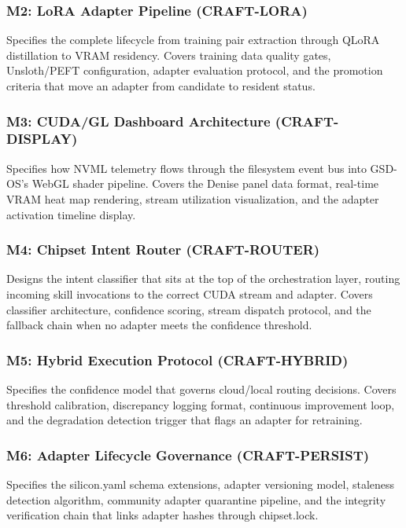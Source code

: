 \documentclass[11pt,letterpaper]{article}
\begin{document}
\subsubsection{M2: LoRA Adapter Pipeline (CRAFT-LORA)}

Specifies the complete lifecycle from training pair extraction through QLoRA distillation to VRAM residency. Covers training data quality gates, Unsloth/PEFT configuration, adapter evaluation protocol, and the promotion criteria that move an adapter from candidate to resident status.

\subsubsection{M3: CUDA/GL Dashboard Architecture (CRAFT-DISPLAY)}

Specifies how NVML telemetry flows through the filesystem event bus into GSD-OS's WebGL shader pipeline. Covers the Denise panel data format, real-time VRAM heat map rendering, stream utilization visualization, and the adapter activation timeline display.

\subsubsection{M4: Chipset Intent Router (CRAFT-ROUTER)}

Designs the intent classifier that sits at the top of the orchestration layer, routing incoming skill invocations to the correct CUDA stream and adapter. Covers classifier architecture, confidence scoring, stream dispatch protocol, and the fallback chain when no adapter meets the confidence threshold.

\subsubsection{M5: Hybrid Execution Protocol (CRAFT-HYBRID)}

Specifies the confidence model that governs cloud/local routing decisions. Covers threshold calibration, discrepancy logging format, continuous improvement loop, and the degradation detection trigger that flags an adapter for retraining.

\subsubsection{M6: Adapter Lifecycle Governance (CRAFT-PERSIST)}

Specifies the silicon.yaml schema extensions, adapter versioning model, staleness detection algorithm, community adapter quarantine pipeline, and the integrity verification chain that links adapter hashes through chipset.lock.
\end{document}
